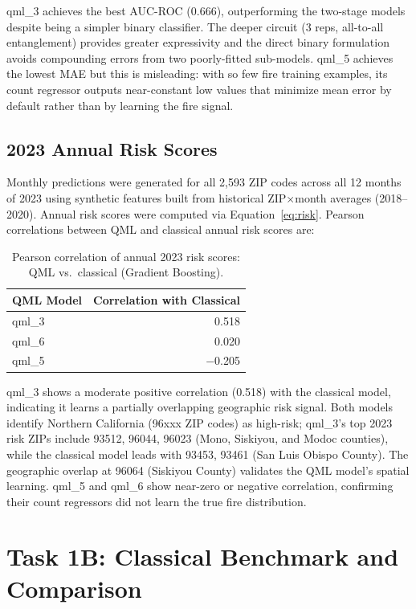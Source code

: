\documentclass[11pt,a4paper]{article}
\begin{document}
qml\_3 achieves the best AUC-ROC (0.666), outperforming the two-stage models
despite being a simpler binary classifier. The deeper circuit (3 reps, all-to-all
entanglement) provides greater expressivity and the direct binary formulation
avoids compounding errors from two poorly-fitted sub-models. qml\_5 achieves
the lowest MAE but this is misleading: with so few fire training examples, its
count regressor outputs near-constant low values that minimize mean error by
default rather than by learning the fire signal.

\subsection{2023 Annual Risk Scores}

Monthly predictions were generated for all 2,593 ZIP codes across all 12 months
of 2023 using synthetic features built from historical ZIP$\times$month averages
(2018--2020). Annual risk scores were computed via Equation~\eqref{eq:risk}.
Pearson correlations between QML and classical annual risk scores are:

\begin{table}[H]
\centering
\caption{Pearson correlation of annual 2023 risk scores: QML vs.\ classical (Gradient Boosting).}
\begin{tabular}{lr}
\toprule
\textbf{QML Model} & \textbf{Correlation with Classical} \\
\midrule
qml\_3 & 0.518 \\
qml\_6 & 0.020 \\
qml\_5 & $-$0.205 \\
\bottomrule
\end{tabular}
\label{tab:corr}
\end{table}

qml\_3 shows a moderate positive correlation (0.518) with the classical model,
indicating it learns a partially overlapping geographic risk signal. Both models
identify Northern California (96xxx ZIP codes) as high-risk; qml\_3's top 2023
risk ZIPs include 93512, 96044, 96023 (Mono, Siskiyou, and Modoc counties),
while the classical model leads with 93453, 93461 (San Luis Obispo County).
The geographic overlap at 96064 (Siskiyou County) validates the QML model's
spatial learning. qml\_5 and qml\_6 show near-zero or negative correlation,
confirming their count regressors did not learn the true fire distribution.

\section{Task 1B: Classical Benchmark and Comparison}
\label{sec:classical}
\end{document}
